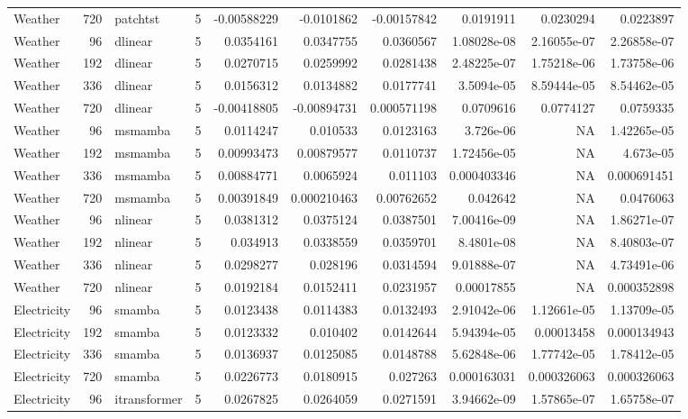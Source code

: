 \begin{longtable}{lrllrrrrrr}
Weather & 720 & patchtst & 5 & -0.00588229 & -0.0101862 & -0.00157842 & 0.0191911 & 0.0230294 & 0.0223897 \\
Weather & 96 & dlinear & 5 & 0.0354161 & 0.0347755 & 0.0360567 & 1.08028e-08 & 2.16055e-07 & 2.26858e-07 \\
Weather & 192 & dlinear & 5 & 0.0270715 & 0.0259992 & 0.0281438 & 2.48225e-07 & 1.75218e-06 & 1.73758e-06 \\
Weather & 336 & dlinear & 5 & 0.0156312 & 0.0134882 & 0.0177741 & 3.5094e-05 & 8.59444e-05 & 8.54462e-05 \\
Weather & 720 & dlinear & 5 & -0.00418805 & -0.00894731 & 0.000571198 & 0.0709616 & 0.0774127 & 0.0759335 \\
Weather & 96 & msmamba & 5 & 0.0114247 & 0.010533 & 0.0123163 & 3.726e-06 & NA & 1.42265e-05 \\
Weather & 192 & msmamba & 5 & 0.00993473 & 0.00879577 & 0.0110737 & 1.72456e-05 & NA & 4.673e-05 \\
Weather & 336 & msmamba & 5 & 0.00884771 & 0.0065924 & 0.011103 & 0.000403346 & NA & 0.000691451 \\
Weather & 720 & msmamba & 5 & 0.00391849 & 0.000210463 & 0.00762652 & 0.042642 & NA & 0.0476063 \\
Weather & 96 & nlinear & 5 & 0.0381312 & 0.0375124 & 0.0387501 & 7.00416e-09 & NA & 1.86271e-07 \\
Weather & 192 & nlinear & 5 & 0.034913 & 0.0338559 & 0.0359701 & 8.4801e-08 & NA & 8.40803e-07 \\
Weather & 336 & nlinear & 5 & 0.0298277 & 0.028196 & 0.0314594 & 9.01888e-07 & NA & 4.73491e-06 \\
Weather & 720 & nlinear & 5 & 0.0192184 & 0.0152411 & 0.0231957 & 0.00017855 & NA & 0.000352898 \\
Electricity & 96 & smamba & 5 & 0.0123438 & 0.0114383 & 0.0132493 & 2.91042e-06 & 1.12661e-05 & 1.13709e-05 \\
Electricity & 192 & smamba & 5 & 0.0123332 & 0.010402 & 0.0142644 & 5.94394e-05 & 0.00013458 & 0.000134943 \\
Electricity & 336 & smamba & 5 & 0.0136937 & 0.0125085 & 0.0148788 & 5.62848e-06 & 1.77742e-05 & 1.78412e-05 \\
Electricity & 720 & smamba & 5 & 0.0226773 & 0.0180915 & 0.027263 & 0.000163031 & 0.000326063 & 0.000326063 \\
Electricity & 96 & itransformer & 5 & 0.0267825 & 0.0264059 & 0.0271591 & 3.94662e-09 & 1.57865e-07 & 1.65758e-07 \\

\end{longtable}
